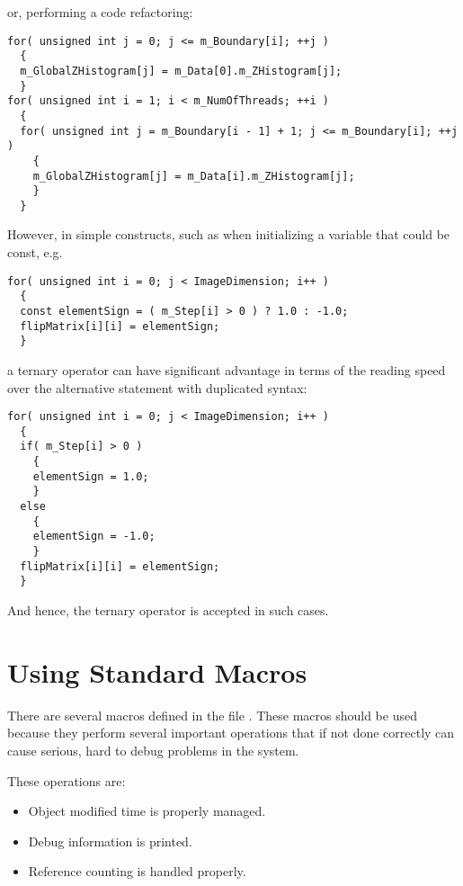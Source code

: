 or, performing a code refactoring:

\small
\begin{verbatim}
for( unsigned int j = 0; j <= m_Boundary[i]; ++j )
  {
  m_GlobalZHistogram[j] = m_Data[0].m_ZHistogram[j];
  }
for( unsigned int i = 1; i < m_NumOfThreads; ++i )
  {
  for( unsigned int j = m_Boundary[i - 1] + 1; j <= m_Boundary[i]; ++j )
    {
    m_GlobalZHistogram[j] = m_Data[i].m_ZHistogram[j];
    }
  }
\end{verbatim}
\normalsize

However, in simple constructs, such as when initializing a variable that could
be const, e.g.

\small
\begin{verbatim}
for( unsigned int i = 0; j < ImageDimension; i++ )
  {
  const elementSign = ( m_Step[i] > 0 ) ? 1.0 : -1.0;
  flipMatrix[i][i] = elementSign;
  }
\end{verbatim}
\normalsize

a ternary operator can have significant advantage in terms of the reading speed
over the alternative  statement with duplicated syntax:

\small
\begin{verbatim}
for( unsigned int i = 0; j < ImageDimension; i++ )
  {
  if( m_Step[i] > 0 )
    {
    elementSign = 1.0;
    }
  else
    {
    elementSign = -1.0;
    }
  flipMatrix[i][i] = elementSign;
  }
\end{verbatim}
\normalsize

And hence, the ternary operator is accepted in such cases.


\section{Using Standard Macros}
\label{sec:UsingStandardMacros}

There are several macros defined in the file . These macros
should be used because they perform several important operations that if not
done correctly can cause serious, hard to debug problems in the system.

These operations are:
\begin{itemize}
\item Object modified time is properly managed.
\item Debug information is printed.
\item Reference counting is handled properly.
\end{itemize}

